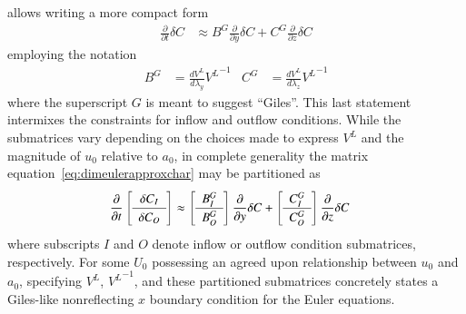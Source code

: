 \documentclass[letterpaper,11pt,nointlimits,reqno,draft]{amsart}
\begin{document}
allows writing a more compact form
\begin{align}
\label{eq:dimeulerapproxchar}
  \frac{\partial}{\partial{}t}
  \delta{}C
  &\approx
  B^G
  \frac{\partial}{\partial{}y}
  \delta{}C
  +
  C^G
  \frac{\partial}{\partial{}z}
  \delta{}C
\end{align}
employing the notation
\begin{align}
  B^G
&=
  \frac{dV^L}{d\lambda_y}
  {V^L}^{-1}
&
  C^G
&=
  \frac{dV^L}{d\lambda_z}
  {V^L}^{-1}
\end{align}
where the superscript $G$ is meant to suggest ``Giles''.  This last statement
intermixes the constraints for inflow and outflow conditions.  While the
submatrices vary depending on the choices made to express $V^L$ and the
magnitude of $u_0$ relative to $a_0$, in complete generality the matrix
equation~\eqref{eq:dimeulerapproxchar} may be partitioned as
\begin{align}
\label{eq:dimeulerapproxcharpart}
\renewcommand*{\arraystretch}{1.2}
  \frac{\partial}{\partial{}t}
  \left[\begin{array}{c}\delta{}C_{I}\\\hline\delta{}C_{O}\end{array}\right]
  &\approx
\renewcommand*{\arraystretch}{1.2}
  \left[\begin{array}{c} B^G_{I} \\ \hline B^G_{O} \end{array}\right]
  \frac{\partial}{\partial{}y}
  \delta{}C
  +
  \left[\begin{array}{c} C^G_{I} \\ \hline C^G_{O} \end{array}\right]
  \frac{\partial}{\partial{}z}
  \delta{}C
\end{align}
where subscripts $I$ and $O$ denote inflow or outflow condition submatrices,
respectively.  For some $U_0$ possessing an agreed upon relationship between
$u_0$ and $a_0$, specifying $V^L$, ${V^L}^{-1}$, and these partitioned
submatrices concretely states a Giles-like nonreflecting $x$ boundary
condition for the Euler equations.
\end{document}
